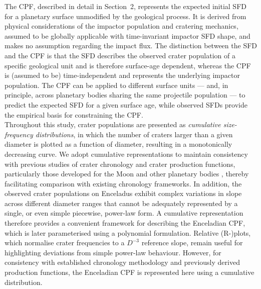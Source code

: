 \documentclass[preprint,11pt,3p,times,authoryear]{elsarticle}
\begin{document}
The CPF, described in detail in Section~2, represents the expected initial SFD for a planetary surface unmodified by the geological process. It is derived from physical considerations of the impactor population and cratering mechanics, assumed to be globally applicable with time-invariant impactor SFD shape, and makes no assumption regarding the impact flux.
The distinction between the SFD and the CPF is that the SFD describes the observed crater population of a specific geological unit and is therefore surface-age dependent, whereas the CPF is (assumed to be) time-independent and represents the underlying impactor population. 
The CPF can be applied to different surface units --- and, in principle, across planetary bodies sharing the same projectile population --- to predict the expected SFD for a given surface age, while observed SFDs provide the empirical basis for constraining the CPF.\\

Throughout this study, crater populations are presented as \textit{cumulative size-frequency distributions}, in which the number of craters larger than a given diameter is plotted as a function of diameter, resulting in a monotonically decreasing curve. 
We adopt cumulative representations to maintain consistency with previous studies of crater chronology and crater production functions, particularly those developed for the Moon and other planetary bodies \citep[e.g.,][]{Neukum1983,Neukum2001}, thereby facilitating comparison with existing chronology frameworks. 
In addition, the observed crater populations on Enceladus exhibit complex variations in slope across different diameter ranges that cannot be adequately represented by a single, or even simple piecewise, power-law form. 
A cumulative representation therefore provides a convenient framework for describing the Enceladian CPF, which is later parameterised using a polynomial formulation.
Relative (R-)plots, which normalise crater frequencies to a $D^{-3}$ reference slope, remain useful for highlighting deviations from simple power-law behaviour. 
However, for consistency with established chronology methodology and previously derived production functions, the Enceladian CPF is represented here using a cumulative distribution.\\
\end{document}
